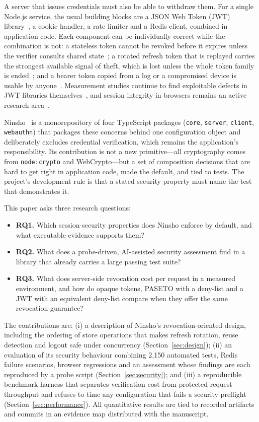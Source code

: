 \documentclass[conference]{IEEEtran}
\begin{document}
A server that issues credentials must also be able to withdraw them. For a single Node.js service, the usual building blocks are a JSON Web Token (JWT) library~\cite{rfc7519}, a cookie handler, a rate limiter and a Redis client, combined in application code. Each component can be individually correct while the combination is not: a stateless token cannot be revoked before it expires unless the verifier consults shared state~\cite{rfc8725,rfc7009}; a rotated refresh token that is replayed carries the strongest available signal of theft, which is lost unless the whole token family is ended~\cite{rfc9700}; and a bearer token copied from a log or a compromised device is usable by anyone~\cite{rfc6750}. Measurement studies continue to find exploitable defects in JWT libraries themselves~\cite{yang2026jwt}, and session integrity in browsers remains an active research area~\cite{calzavara2017surviving,squarcina2023cookie}.

Ninsho~\cite{ninshorepo} is a monorepository of four TypeScript packages (\texttt{core}, \texttt{server}, \texttt{client}, \texttt{webauthn}) that packages these concerns behind one configuration object and deliberately excludes credential verification, which remains the application's responsibility. Its contribution is not a new primitive---all cryptography comes from \texttt{node:crypto} and WebCrypto---but a set of composition decisions that are hard to get right in application code, made the default, and tied to tests. The project's development rule is that a stated security property must name the test that demonstrates it.

This paper asks three research questions:
\begin{itemize}
\item \textbf{RQ1.} Which session-security properties does Ninsho enforce by default, and what executable evidence supports them?
\item \textbf{RQ2.} What does a probe-driven, AI-assisted security assessment find in a library that already carries a large passing test suite?
\item \textbf{RQ3.} What does server-side revocation cost per request in a measured environment, and how do opaque tokens, PASETO with a deny-list and a JWT with an equivalent deny-list compare when they offer the same revocation guarantee?
\end{itemize}

The contributions are: (i) a description of Ninsho's revocation-oriented design, including the ordering of store operations that makes refresh rotation, reuse detection and logout safe under concurrency (Section~\ref{sec:design}); (ii) an evaluation of its security behaviour combining 2,150 automated tests, Redis failure scenarios, browser regressions and an assessment whose findings are each reproduced by a probe script (Section~\ref{sec:security}); and (iii) a reproducible benchmark harness that separates verification cost from protected-request throughput and refuses to time any configuration that fails a security preflight (Section~\ref{sec:performance}). All quantitative results are tied to recorded artifacts and commits in an evidence map distributed with the manuscript.
\end{document}
